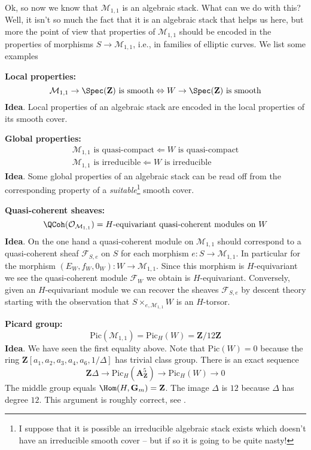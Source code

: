 \noindent
Ok, so now we know that $\mathcal{M}_{1, 1}$ is an algebraic
stack. What can we do with this? Well, it isn't so much the fact that it
is an algebraic stack that helps us here, but more the point of view that
properties of $\mathcal{M}_{1, 1}$ should be encoded in the properties
of morphisms $S \to \mathcal{M}_{1, 1}$, i.e., in families of elliptic
curves. We list some examples

\medskip\noindent
{\bf Local properties:}
$$
\mathcal{M}_{1, 1} \to \Spec(\mathbf{Z})\text{ is smooth}
\Leftrightarrow
W \to \Spec(\mathbf{Z})\text{ is smooth}
$$
{\bf Idea}. Local properties of an algebraic stack are encoded in the local
properties of its smooth cover.

\medskip\noindent
{\bf Global properties:}
$$
\begin{matrix}
\mathcal{M}_{1, 1}\text{ is quasi-compact} \Leftarrow W\text{ is quasi-compact}
\\
\mathcal{M}_{1, 1}\text{ is irreducible} \Leftarrow W\text{ is irreducible}
\end{matrix}
$$
{\bf Idea}. Some global properties of an algebraic stack can be read off
from the corresponding property of a {\it suitable}\footnote{I suppose that
it is possible an irreducible algebraic stack exists which doesn't have an
irreducible smooth cover -- but if so it is going to be quite nasty!}
smooth cover.

\medskip\noindent
{\bf Quasi-coherent sheaves:}
$$
\QCoh(\mathcal{O}_{\mathcal{M}_{1, 1}}) =
H\text{-equivariant quasi-coherent modules on }W
$$
{\bf Idea}. On the one hand a quasi-coherent module on $\mathcal{M}_{1, 1}$
should correspond to a quasi-coherent sheaf $\mathcal{F}_{S, e}$ on $S$
for each morphism $e : S \to \mathcal{M}_{1, 1}$. In particular for the
morphism $(E_W, f_W, 0_W) :  W \to \mathcal{M}_{1, 1}$. Since this morphism is
$H$-equivariant we see the quasi-coherent module $\mathcal{F}_W$ we obtain is
$H$-equivariant. Conversely, given an $H$-equivariant module we can recover
the  sheaves $\mathcal{F}_{S, e}$ by descent theory starting with the
observation that $S \times_{e, \mathcal{M}_{1, 1}} W$ is an $H$-torsor.

\medskip\noindent
{\bf Picard group:}
$$
\text{Pic}(\mathcal{M}_{1, 1}) = \text{Pic}_H(W) = \mathbf{Z}/12\mathbf{Z}
$$
{\bf Idea}. We have seen the first equality above. Note that
$\text{Pic}(W) = 0$ because the ring
$\mathbf{Z}[a_1, a_2, a_3, a_4, a_6, 1/\Delta]$
has trivial class group.
There is an exact sequence
$$
\mathbf{Z}\Delta \to
\text{Pic}_H(\mathbf{A}^5_{\mathbf{Z}}) \to
\text{Pic}_H(W) \to 0
$$
The middle group equals $\Hom(H, \mathbf{G}_m) = \mathbf{Z}$.
The image $\Delta$ is $12$ because $\Delta$ has degree $12$.
This argument is roughly correct, see \cite{PicM11}.

